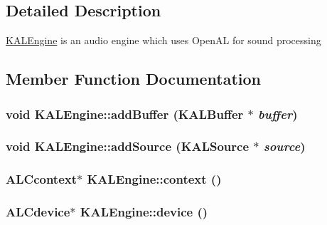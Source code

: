 \subsection{Detailed Description}
\hyperlink{class_k_a_l_engine}{KALEngine} is an audio engine which uses OpenAL for sound processing 

\subsection{Member Function Documentation}
\hypertarget{class_k_a_l_engine_c702ef3fb20c3dae650415f58e095b0f}{
\subsubsection[{addBuffer}]{\setlength{\rightskip}{0pt plus 5cm}void KALEngine::addBuffer ({\bf KALBuffer} $\ast$ {\em buffer})}}
\label{class_k_a_l_engine_c702ef3fb20c3dae650415f58e095b0f}


\hypertarget{class_k_a_l_engine_133eb302b80d87fd3bcfff7e07017d1b}{
\subsubsection[{addSource}]{\setlength{\rightskip}{0pt plus 5cm}void KALEngine::addSource ({\bf KALSource} $\ast$ {\em source})}}
\label{class_k_a_l_engine_133eb302b80d87fd3bcfff7e07017d1b}


\hypertarget{class_k_a_l_engine_cfe63944ffe4ee4437eae9c3e7f0d682}{
\subsubsection[{context}]{\setlength{\rightskip}{0pt plus 5cm}ALCcontext$\ast$ KALEngine::context ()}}
\label{class_k_a_l_engine_cfe63944ffe4ee4437eae9c3e7f0d682}


\hypertarget{class_k_a_l_engine_2b3a425e09e9a1a8dcc0756ff0226152}{
\subsubsection[{device}]{\setlength{\rightskip}{0pt plus 5cm}ALCdevice$\ast$ KALEngine::device ()}}
\label{class_k_a_l_engine_2b3a425e09e9a1a8dcc0756ff0226152}


